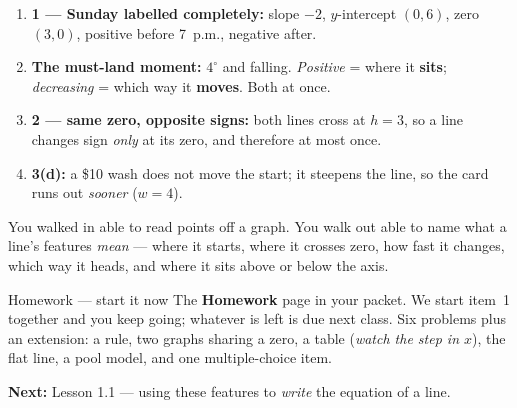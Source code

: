 \documentclass[aspectratio=169, 11pt]{beamer}
\begin{document}
\begin{frame}[t, plain]
  \begin{enumerate}\setlength{\itemsep}{5pt}
    \item \textbf{1 --- Sunday labelled completely:} slope $-2$, $y$-intercept $(0,6)$, zero
          $(3,0)$, positive before 7~p.m., negative after.
    \item \textbf{The must-land moment:} $4^\circ$ and falling. \emph{Positive} = where it
          \textbf{sits}; \emph{decreasing} = which way it \textbf{moves}. Both at once.
    \item \textbf{2 --- same zero, opposite signs:} both lines cross at $h=3$, so a line changes
          sign \emph{only} at its zero, and therefore at most once.
    \item \textbf{3(d):} a \$10 wash does not move the start; it steepens the line, so the card runs
          out \emph{sooner} ($w=4$).
  \end{enumerate}
\end{frame}

\begin{frame}[t, plain]
  You walked in able to read points off a graph. You walk out able to name what a line's features
  \emph{mean} --- where it starts, where it crosses zero, how fast it changes, which way it heads,
  and where it sits above or below the axis.
  \vspace{5pt}
  \begin{block}{Homework --- start it now}
    The \textbf{Homework} page in your packet. We start item~1 together and you keep going; whatever
    is left is due next class. Six problems plus an extension:
    a rule, two graphs sharing a zero, a table (\emph{watch the step in $x$}), the flat line, a pool
    model, and one multiple-choice item.
  \end{block}
  \vspace{4pt}
  \textbf{Next:} Lesson 1.1 --- using these features to \emph{write} the equation of a line.
\end{frame}
\end{document}

